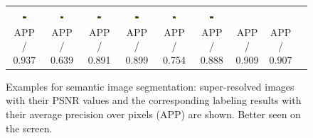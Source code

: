 \begin{figure} [tb]
\begin{tabular*}{\textwidth}{ccccccccc}
\includegraphics[width=0.12\textwidth]{./SR4VT/images/3_22_s_Z_lmnn_5_label.jpg}& 
\includegraphics[width=0.12\textwidth]{./SR4VT/images/3_22_s_R_lmnn_5_label.jpg} &
\includegraphics[width=0.12\textwidth]{./SR4VT/images/3_22_s_S_lmnn_5_label.jpg} &
\includegraphics[width=0.12\textwidth]{./SR4VT/images/3_22_s_A_lmnn_5_label.jpg} &
\includegraphics[width=0.12\textwidth]{./SR4VT/images/3_22_s_J_lmnn_5_label.jpg} &
\includegraphics[width=0.12\textwidth]{./SR4VT/images/3_22_s_A_lmnn_5_label.jpg}  \\
\scriptsize{APP / 0.937} & \scriptsize{APP / 0.639} & \scriptsize{APP / 0.891} & \scriptsize{APP / 0.899}
& \scriptsize{APP / 0.754} & \scriptsize{APP / 0.888} & \scriptsize{APP / 0.909} & \scriptsize{APP / 0.907} \\

\end{tabular*}
\caption{Examples for semantic image segmentation: super-resolved images with their
  PSNR values and the corresponding labeling results
  with their average precision over pixels (APP) are shown. Better seen on the screen.}
\label{fig:example:il}
\end{figure}



